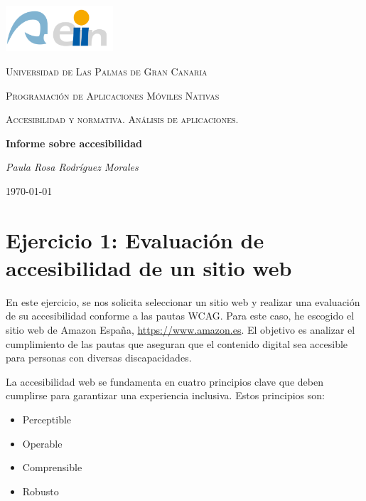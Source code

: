 \documentclass[letterpaper, 12pt]{report}
\begin{document}
\begin{titlepage}
	\centering
	\includegraphics[width=0.3\textwidth]{eii_ulpgc.png}\par\vspace{1cm}
	{\scshape\LARGE Universidad de Las Palmas de Gran Canaria \par}
	\vspace{1cm}
	{\scshape\Large Programaci\'on de Aplicaciones M\'oviles Nativas \par}
	\vspace{.2cm}
    {\scshape\Large Accesibilidad y normativa. Análisis de aplicaciones. \par}
	\vspace{1cm}
	{\Large\bfseries Informe sobre accesibilidad\par}
	\vspace{1cm}
	{\itshape Paula Rosa Rodríguez Morales \par}
	\vfill

	\vfill
	{\large \today\par}
\end{titlepage}

\begin{abstract}
En este informe se evalúa la accesibilidad de un sitio web y de una aplicación móvil, siguiendo las pautas WCAG. Se analiza el cumplimiento de los principios de Perceptibilidad, Operabilidad, Comprensibilidad y Robustez en ambos casos.
\end{abstract}

\tableofcontents
\newpage

\section{Ejercicio 1: Evaluación de accesibilidad de un sitio web}

En este ejercicio, se nos solicita seleccionar un sitio web y realizar una evaluación de su accesibilidad conforme a las pautas WCAG. Para este caso, he escogido el sitio web de Amazon España, \url{https://www.amazon.es}. El objetivo es analizar el cumplimiento de las pautas que aseguran que el contenido digital sea accesible para personas con diversas discapacidades.

La accesibilidad web se fundamenta en cuatro principios clave que deben cumplirse para garantizar una experiencia inclusiva. Estos principios son:
\begin{itemize}
    \item Perceptible
    \item Operable
    \item Comprensible
    \item Robusto
\end{itemize}
\end{document}
